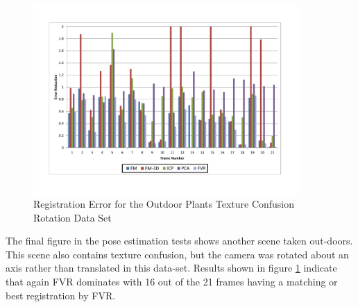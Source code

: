 \begin{figure}[!htb]
\centering
\includegraphics[width=4.0in]{images/results/Plants_Outdoors_Texture_Confusion_Rotation}
\caption{Registration Error for the Outdoor Plants Texture Confusion Rotation Data Set}
\label{fig:PET17}
\end{figure}

The final figure in the pose estimation tests shows another scene taken out-doors. This scene also contains texture confusion, but the camera was rotated about an axis rather than translated in this data-set. Results shown in figure \ref{fig:PET17} indicate that again FVR dominates with 16 out of the 21 frames having a matching or best registration by FVR. 
